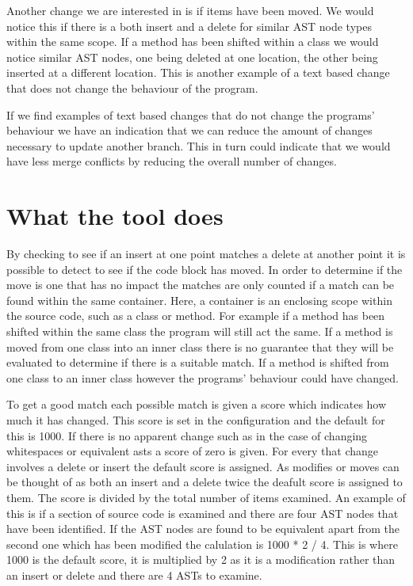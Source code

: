 Another change we are interested in is if items have been moved.  We would notice this if there is a both insert and a delete for similar AST node types within the same scope.  If a method has been shifted within a class we would notice similar AST nodes, one being deleted at one location, the other being inserted at a different location.  This is another example of a text based change that does not change the behaviour of the program.


If we find examples of text based changes that do not change the programs' behaviour we have an indication that we can reduce the amount of changes necessary to update another branch. This in turn could indicate that we would have less merge conflicts by reducing the overall number of changes.

\section{What the tool does}

By checking to see if an insert at one point matches a delete at another point it is possible to detect to see if the code block has moved. In order to determine if the move is one that has no impact the matches are only counted if a match can be found within the same container.  Here, a container is an enclosing scope within the source code, such as a class or method. For example if a method has been shifted within the same class the program will still act the same.  If a method is moved from one class into an inner class there is no guarantee that they will be evaluated to determine if there is a suitable match.  If a method is shifted from one class to an inner class however the programs' behaviour could have changed.

To get a good match each possible match is given a score which indicates how much it has changed.  This score is set in the configuration and the default for this is 1000. If there is no apparent change such as in the case of changing whitespaces or equivalent asts a score of zero is given.  For every that change involves a delete or insert the default score is assigned.  As modifies or moves can be thought of as both an insert and a delete twice the deafult score is assigned to them.  The score is divided by the total number of items examined.  An example of this is if a section of source code is examined and there are four AST nodes that have been identified.  If the AST nodes are found to be equivalent apart from the second one which has been modified the calulation is 1000 * 2 / 4.  This is where 1000 is the default score, it is multiplied by 2 as it is a modification rather than an insert or delete and there are 4 ASTs to examine.

